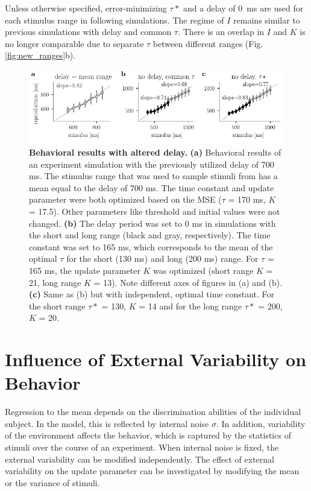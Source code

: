 \documentclass[10pt]{article}
\begin{document}
Unless otherwise specified, error-minimizing $\tau*$ and a delay of 0~ms are used for each stimulus range in following simulations. The regime of $I$ remains similar to previous simulations with delay and common $\tau$. There is an overlap in $I$ and $K$ is no longer comparable due to separate $\tau$ between different ranges (Fig. \ref{fig:new_ranges}b).

\begin{figure}[ht]
	\centering
	\includegraphics{figures/delay.pdf}
	\caption{\textbf{Behavioral results with altered delay.} 
	\textbf{(a)} Behavioral results of an experiment simulation with the previously utilized delay of 700 ms. The stimulus range that was used to sample stimuli from has a mean equal to the delay of 700 ms. The time constant and update parameter were both optimized based on the MSE ($\tau$ = 170 ms, $K$ = 17.5). Other parameters like threshold and initial values were not changed. 
	\textbf{(b)} The delay period was set to 0 ms in simulations with the short and long range (black and gray, respectively). The time constant was set to 165 ms, which corresponds to the mean of the optimal $\tau$ for the short (130 ms) and long (200 ms) range. For $\tau$ = 165 ms, the update parameter $K$ was optimized (short range $K$ = 21, long range $K$ = 13). Note different axes of figures in (a) and (b).
	\textbf{(c)} Same as (b) but with independent, optimal time constant. For the short range $\tau*$ = 130, $K$ = 14 and for the long range $\tau*$ = 200, $K$ = 20.
	}
\label{fig:delay}
\end{figure}


\section{Influence of External Variability on Behavior} \label{externalvar}
Regression to the mean depends on the discrimination abilities of the individual subject. In the model, this is reflected by internal noise $\sigma$.
In addition, variability of the environment affects the behavior, which is captured by the statistics of stimuli over the course of an experiment. 
When internal noise is fixed, the external variability can be modified independently. 
The effect of external variability on the update parameter can be investigated by modifying the mean or the variance of stimuli. 
\end{document}

